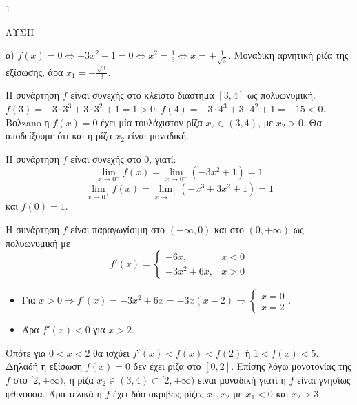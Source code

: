 \begin{ylh}{1}
    \item [Διαφορικός Λογισμός, Ολοκληρωτικός Λογισμός]
\end{ylh}
ΛΥΣΗ

\begin{alist}
\item α) $f(x)=0 \Leftrightarrow -3x^2+1=0 \Leftrightarrow x^2=\frac{1}{3} \Leftrightarrow x=\pm \frac{1}{\sqrt{3}}$.
Μοναδική αρνητική ρίζα της εξίσωσης, άρα $x_1 = -\frac{\sqrt{3}}{3}$.

Η συνάρτηση $f$ είναι συνεχής στο κλειστό διάστημα $[3,4]$ ως πολυωνυμική.
$f(3) = -3 \cdot 3^3 + 3 \cdot 3^2 + 1 = 1 > 0$.
$f(4) = -3 \cdot 4^3 + 3 \cdot 4^2 + 1 = -15 < 0$.
Βολzano η $f(x)=0$ έχει μία τουλάχιστον ρίζα $x_2 \in (3,4)$, με $x_2 > 0$.
Θα αποδείξουμε ότι και η ρίζα $x_2$ είναι μοναδική.

Η συνάρτηση $f$ είναι συνεχής στο $0$, γιατί:
\[ \lim_{x \to 0^-} f(x) = \lim_{x \to 0^-} (-3x^2+1) = 1 \]
\[ \lim_{x \to 0^+} f(x) = \lim_{x \to 0^+} (-x^3+3x^2+1) = 1 \]
και $f(0)=1$.

Η συνάρτηση $f$ είναι παραγωγίσιμη στο $(-\infty, 0)$ και στο $(0, +\infty)$ ως πολυωνυμική με
\[ f'(x) = \begin{cases} -6x, & x < 0 \\ -3x^2+6x, & x > 0 \end{cases} \]
\begin{itemize}
    \item Για $x > 0 \Rightarrow f'(x) = -3x^2+6x = -3x(x-2) \Rightarrow \begin{cases} x=0 \\ x=2 \end{cases}$.
    \item Άρα $f'(x) < 0$ για $x > 2$.
\end{itemize}
Οπότε για $0 < x < 2$ θα ισχύει $f'(x) < f(x) < f(2)$ ή $1 < f(x) < 5$. Δηλαδή η εξίσωση $f(x)=0$ δεν έχει ρίζα στο $[0,2]$.
Επίσης λόγω μονοτονίας της $f$ στο $[2, +\infty)$, η ρίζα $x_2 \in (3,4) \subset [2, +\infty)$ είναι μοναδική γιατί η $f$ είναι γνησίως φθίνουσα.
Άρα τελικά η $f$ έχει δύο ακριβώς ρίζες $x_1, x_2$ με $x_1 < 0$ και $x_2 > 3$.


\end{alist}
